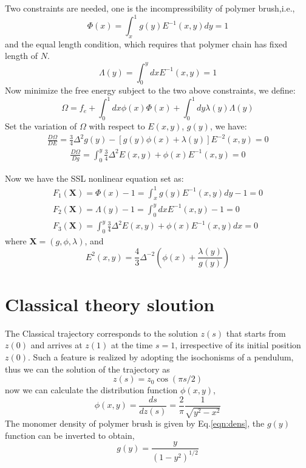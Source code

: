 \documentclass{article}
\begin{document}
Two constraints are needed, one is the incompressibility of polymer brush,i.e., 
\begin{equation}
 \Phi(x)=\int^{1}_{x} g(y)E^{-1}(x,y)dy=1
\end{equation}
and the equal length condition, which requires that polymer chain has fixed length of $N$.
\begin{equation}
 \Lambda(y)=\int^{y}_{0}dxE^{-1}(x,y)=1
 \label{eqn:equal-length}
\end{equation}
Now minimize the free energy subject to the two above constraints, 
we define:
\begin{equation}
 \Omega=f_e+\int^{1}_{0}dx\phi(x)\Phi(x)+\int^{1}_{0}dy\lambda(y)\Lambda(y)
\end{equation}
Set the variation of $\Omega$ with respect to $E(x,y)$, $g(y)$, we have:
\begin{eqnarray}
\frac{D\Omega}{DE} =\frac{3}{4}\Delta^2g(y)-[g(y)\phi(x)+\lambda(y)]E^{-2}(x,y)=0
\end{eqnarray}
\begin{eqnarray}
\frac{D\Omega}{Dg}=\int^{y}_{0}\frac{3}{4}\Delta^2E(x,y)+\phi(x)E^{-1}(x,y)=0
\label{eqn:F3}
\end{eqnarray}

Now we have the SSL nonlinear equation set as:
\begin{eqnarray}
F_1(\mathbf{X})= \Phi(x)-1=\int^{1}_{x} g(y)E^{-1}(x,y)dy-1=0 \\
F_2(\mathbf{X})=\Lambda(y)-1=\int^{y}_{0}dxE^{-1}(x,y)-1=0 \\
F_3(\mathbf{X})=\int^{y}_{0}\frac{3}{4}\Delta^2E(x,y)+\phi(x)E^{-1}(x,y)dx=0
\end{eqnarray}
where $\mathbf{X}=({g,\phi,\lambda})$, and
\begin{equation}
 E^{2}(x,y)=\frac{4}{3}\Delta^{-2}(\phi(x)+\frac{\lambda(y)}{g(y)})
 \label{eqn:Exy}
\end{equation}







\section{Classical theory sloution}
The Classical trajectory corresponds to the solution $z(s)$ that starts from $z(0)$ and arrives at $z(1)$ at the time $s=1$, irrespective
of its initial position $z(0)$. Such a feature is realized by adopting the isochonisms of a pendulum, thus we can the solution of
the trajectory as
\begin{equation}
 z(s)=z_0\cos(\pi s/2)
\end{equation}
now we can calculate the distribution function $\phi(x,y)$,
\begin{equation}
 \phi(x,y)=\frac{ds}{dz(s)}=\frac{2}{\pi}\frac{1}{\sqrt{y^2-x^2}}
\end{equation}
The monomer density of polymer brush is given by Eq.\ref{eqn:dens}, the $g(y)$ function can be inverted to obtain,
\begin{equation}
 g(y)=\frac{y}{(1-y^2)^{1/2}}
\end{equation}
\end{document}
